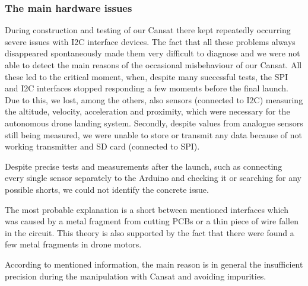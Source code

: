 \documentclass{cfp}
\begin{document}
\subsubsection{The main hardware issues}
\par During construction and testing of our Cansat there kept repeatedly occurring severe issues with I2C interface devices. The fact that all these problems always disappeared spontaneously made them very difficult to diagnose and we were not able to detect the main reasons of the occasional misbehaviour of our Cansat. All these led to the critical moment, when, despite many successful tests, the SPI and I2C interfaces stopped responding a few moments before the final launch. Due to this, we lost, among the others, also sensors (connected to I2C) measuring the altitude, velocity, acceleration and proximity, which were necessary for the autonomous drone landing system. Secondly, despite values from analogue sensors still being measured, we were unable to store or transmit any data because of not working transmitter and SD card (connected to SPI). 
\par Despite precise tests and measurements after the launch, such as connecting every single sensor separately to the Arduino and checking it or searching for any possible shorts, we could not identify the concrete issue.
\par The most probable explanation is a short between mentioned interfaces which was caused by a metal fragment from cutting PCBs or a thin piece of wire fallen in the circuit. This theory is also supported by the fact that there were found a few metal fragments in drone motors.
\par According to mentioned information, the main reason is in general the insufficient precision during the manipulation with Cansat and avoiding impurities.
\end{document}
